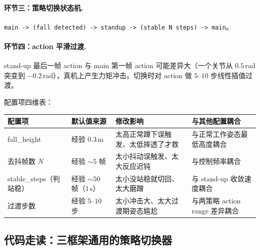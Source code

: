 \paragraph{环节三：策略切换状态机.}
\verb|main -> (fall detected) -> standup -> (stable N steps) -> main|。

\paragraph{环节四：action 平滑过渡.}
stand-up 最后一帧 action 与 main 第一帧 action 可能差异大（一个关节从 $0.5$\,rad 突变到 $-0.2$\,rad），真机上产生力矩冲击。切换时对 action 做 $5$--$10$ 步线性插值过渡。

配置项四维表：

\begin{center}
\small
\begin{tabular}{p{2.6cm}p{2.8cm}p{3.0cm}p{3.0cm}}
\hline
配置项 & 默认值来源 & 修改影响 & 与其他配置耦合 \\
\hline
fall\_height & 经验 $0.3$\,m & 太高正常蹲下误触发、太低摔透了才救 & 与正常工作姿态最低高度耦合 \\
去抖帧数 $N$ & 经验 $\sim 5$ 帧 & 太小抖动误触发、太大反应迟钝 & 与控制频率耦合 \\
stable\_steps（判站稳） & 经验 $\sim 50$ 帧（$1$\,s） & 太小没站稳就切回、太大磨蹭 & 与 stand-up 收敛速度耦合 \\
过渡步数 & 经验 $5$--$10$ 步 & 太小冲击大、太大过渡期姿态尴尬 & 与两策略 action range 差异耦合 \\
\hline
\end{tabular}
\end{center}

\subsection{代码走读：三框架通用的策略切换器}

